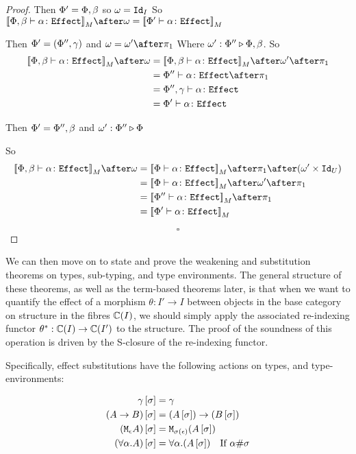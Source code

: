 \documentclass{Report}
\begin{document}
\begin{proof}
    \subcase{$\w=\i$}
    Then $\Phi' = \Phi,\beta$ so $\omega=\texttt{Id}_{I}$
    So $\deno{\typerelation{\P,\b}{\a}{\effect}}\after\w = \deno{\typerelation{\P'}{\a}{\effect}}$
    
    Then $\Phi' = (\Phi'',\gamma)$ and $\w=\w'\after\p$
    Where $\omega' : \Phi'' \triangleright \Phi,\beta$.
    So
    \begin{align}
        \deno{\typerelation{\P,\b}{\a}{\effect}}\after\w & = \deno{\typerelation{\P,\b}{\a}{\effect}}\after\w'\after\p\\
        & = {\typerelation{\P''}{\a}{\effect}}\after\p\\
        & = {\typerelation{\P'',\g}{\a}{\effect}}\\
        & = {\typerelation{\P'}{\a}{\effect}}\\
    \end{align}
    
    Then $\Phi'=\Phi'',\beta$ and $\omega' : \Phi'' \triangleright \Phi$
    
    So \begin{align}
        \deno{\typerelation{\P,\b}{\a}{\effect}}\after\w &= \deno{\typerelation{\P}{\a}{\effect}}\after\p\after(\w'\times\Id{U})\\
        &=\deno{\typerelation{\P}{\a}{\effect}}\after\w'\after\p\\
        & = \deno{\typerelation{\P''}{\a}{\effect}}\after\p\\
        & = \deno{\typerelation{\P'}{\a}{\effect}}\\
    \end{align}

    $$\square$$
\end{proof}




We can then move on to state and prove the weakening and substitution theorems on types, sub-typing, and type environments. The general structure of these theorems, as well as the term-based theorems later, is that when we want to quantify the effect of a morphism $\theta: I' \rightarrow I$ between objects in the base category on structure in the fibres $\mathbb{C}(I)$, we should simply apply the associated re-indexing functor $\theta^*: \mathbb{C}(I) \rightarrow \mathbb{C}(I')$ to the structure. The proof of the soundness of this operation is driven by the S-closure of the re-indexing functor.

Specifically, effect substitutions have the following actions on types, and type-environments:

\begin{align*}
    \gamma\left[\sigma\right] &= \gamma \\
    (A\rightarrow B)\left[\sigma\right] &= (A\left[\sigma\right])\rightarrow (B\left[\sigma\right]) \\
    (\texttt{M}_{\epsilon}{A})\left[\sigma\right] &= \texttt{M}_{\sigma(\epsilon)}{(A\left[\sigma\right])}\\
    (\forall \alpha. A)\left[\sigma\right] &= \forall \alpha. (A\left[\sigma\right])\quad\text{If $\alpha\#\sigma$}
\end{align*}
\end{document}
